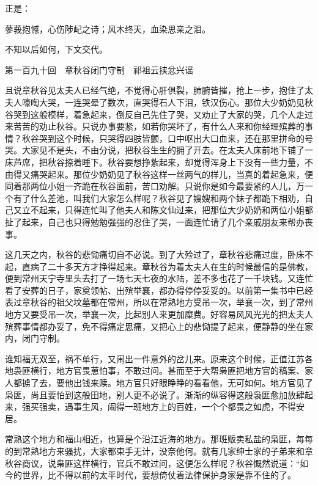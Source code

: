 \documentclass[12pt,UTF8]{ctexbook}
\begin{document}
{{{正是：

蓼莪抱憾，心伤陟屺之诗；风木终天，血染思亲之泪。

不知以后如何，下文交代。





第一百九十回　章秋谷闭门守制　祁祖云挟忿兴谣





且说章秋谷见太夫人已经气绝，不觉得心肝俱裂，肺腑皆摧，抢上一步，抱住了太夫人嚎啕大哭，一连哭晕了数次，直哭得石人下泪，铁汉伤心。那位大少奶奶见秋谷哭到这般模样，着急起来，倒反自己先住了哭，又劝止了大家的哭，几个人走过来苦苦的劝止秋谷。只说办事要紧，如若你哭坏了，有什么人来和你经理殡葬的事情？秋谷哭到这个时候，只哭得四肢皆颤，口中呕出大口血来，还在那里拼命的号哭。大家见不是头，不由分说，把秋谷生生的拥了开去。在太夫人床前地下铺了一床芦席，把秋谷捺着睡下。秋谷要想挣紥起来，却觉得浑身上下没有一些力量，不由得又痛哭起来。那位少奶奶见了秋谷这样一丝两气的样儿，当真的着起急来，便同着那两位小姐一齐跪在秋谷面前，苦口劝解。只说你是如今最要紧的人儿，万一个有了什么差池，叫我们大家怎么样呢？秋谷见了嫂嫂和两个妹子都跪下相劝，自己又立不起来，只得连忙叫了他夫人和陈文仙过来，把那位大少奶奶和两位小姐都扯了起来，自己也只得勉勉强强的忍住了哭，一面连忙请了几个亲戚朋友来帮办丧事。

这几天之内，秋谷的悲恸痛切自不必说。到了大殓过了，章秋谷悲痛过度，卧床不起，直病了二十多天方才挣得起来。章秋谷为着太夫人在生的时候最信的是佛教，便到常州天宁寺里头去打了一场七天七夜的水陆，差不多也花了一千块钱。又连忙看了安葬的日子，家奠领帖、出殡举襄，都办得停停妥妥的。以前第一集书中已经表过章秋谷的祖父坟墓都在常州，所以在常熟地方受吊一次，举襄一次，到了常州地方又要受吊一次，举襄一次，比起别人来更加糜费。好容易风风光光的把太夫人殡葬事情都办妥了，免不得痛定思痛，又把心上的悲恸提了起来，便静静的坐在家内，闭门守制。

谁知福无双至，祸不单行，又闹出一件意外的岔儿来。原来这个时候，正值江苏各地袅匪横行，地方官畏葸怕事，不敢过问。甚而至于大帮枭匪把地方官的稿案、家人都掳了去，要他出钱来赎。地方官只好眼睁睁的看看他，无可如何。地方官见了枭匪，尚且要怕到这般田地，别人更不必说了。渐渐的纵容得这般袅匪愈加放肆起来，强买强卖，遇事生风，闹得一班地方上的百姓，一个个都畏之如虎，不得安居。

常熟这个地方和福山相近，也算是个沿江近海的地方。那班贩卖私盐的枭匪，每每的到常熟地方来骚扰，大家都束手无计，没奈他何。就有几家绅士家的子弟来和章秋谷商议，说枭匪这样横行，官兵不敢过问，这便怎么样呢？秋谷慨然说道：“如今的世界，比不得以前的太平时代，要想倚仗着法律保护身家是靠不住的了。

}}}
\end{document}

